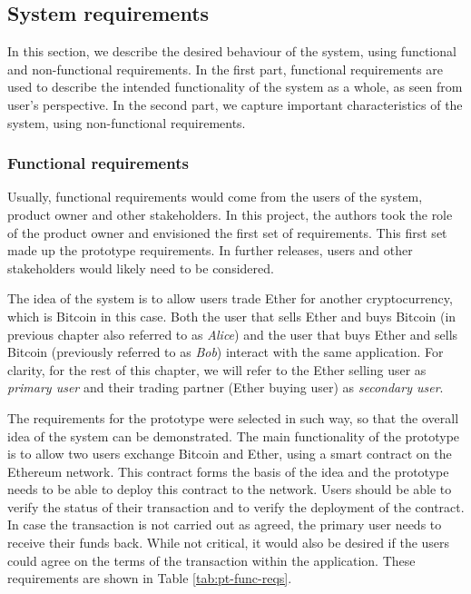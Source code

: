 \subsection{System requirements}\label{sec:system-reqs}

In this section, we describe the desired behaviour of the system, using functional and non-functional requirements. In the first part, functional requirements are used to describe the intended functionality of the system as a whole, as seen from user's perspective. In the second part, we capture important characteristics of the system, using non-functional requirements.

\subsubsection{Functional requirements}
Usually, functional requirements would come from the users of the system, product owner and other stakeholders. In this project, the authors took the role of the product owner and envisioned the first set of requirements. This first set made up the prototype requirements. In further releases, users and other stakeholders would likely need to be considered.


The idea of the system is to allow users trade Ether for another cryptocurrency, which is Bitcoin in this case. Both the user that sells Ether and buys Bitcoin (in previous chapter also referred to as \textit{Alice}) and the user that buys Ether and sells Bitcoin (previously referred to as \textit{Bob}) interact with the same application. For clarity, for the rest of this chapter, we will refer to the Ether selling user as \textit{primary user} and their trading partner (Ether buying user) as \textit{secondary user}.

The requirements for the prototype were selected in such way, so that the overall idea of the system can be demonstrated. The main functionality of the prototype is to allow two users exchange Bitcoin and Ether, using a smart contract on the Ethereum network. This contract forms the basis of the idea and the prototype needs to be able to deploy this contract to the network. Users should be able to verify the status of their transaction and to verify the deployment of the contract. In case the transaction is not carried out as agreed, the primary user needs to receive their funds back. While not critical, it would also be desired if the users could agree on the terms of the transaction within the application. These requirements are shown in Table \ref{tab:pt-func-reqs}. 

